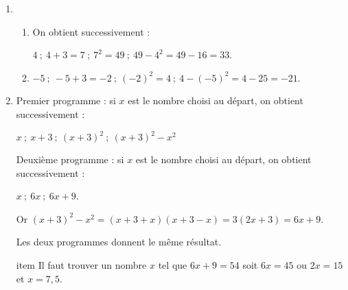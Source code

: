 
\medskip

\begin{enumerate}
\item %


	\begin{enumerate}
		\item %
		On obtient successivement :
		
		$4~;~4 + 3 = 7~;~7^2 = 49~;~49 - 4^2 = 49 - 16 = 33$.
		\item %
		$- 5~;~- 5 + 3 = - 2~;~(- 2)^2 = 4~;~4 - (- 5)^2 = 4 - 25 = - 21$.
	\end{enumerate}
\item %

%
Premier programme : si $x$ est le nombre choisi au départ, on obtient successivement :

$x~;~x + 3~;~(x + 3)^2~;~(x + 3)^2 - x^2 $

Deuxième programme : si $x$ est le nombre choisi au départ, on obtient successivement :

$x~;~6x~;~6x + 9$.

Or $(x + 3)^2 - x^2 = (x + 3 + x)(x + 3 - x) = 3(2x + 3) = 6x + 9$.

Les deux programmes donnent le même résultat.

item %
Il faut trouver un nombre $x$ tel que $6x + 9 = 54$ soit $6x = 45$ ou $2x = 15$ et $x = 7,5$.
\end{enumerate}
 
\vspace{0,5cm}

